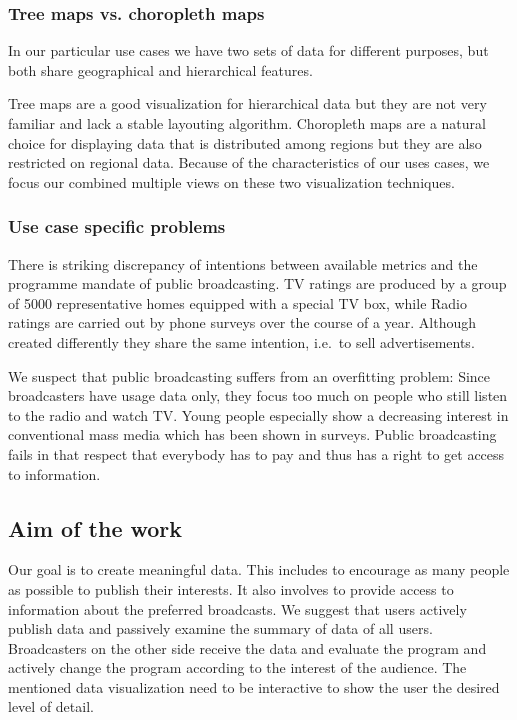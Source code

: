 \documentclass{article}
\begin{document}
\subsubsection{Tree maps vs. choropleth maps}

In our particular use cases we have two sets of data for different purposes, but both share geographical and hierarchical features.

Tree maps are a good visualization for hierarchical data but they are not very familiar and lack a stable layouting algorithm.
Choropleth maps are a natural choice for displaying data that is distributed among regions but they are also restricted on regional data.
Because of the characteristics of our uses cases, we focus our combined multiple views on these two visualization techniques.






\subsubsection{Use case specific problems}
There is striking discrepancy of intentions between available metrics and the programme mandate of public broadcasting.
TV ratings are produced by a group of 5000 representative homes equipped with a special TV box, while Radio ratings are carried out by phone surveys over the course of a year.
Although created differently they share the same intention, i.e.\ to sell advertisements.

We suspect that public broadcasting suffers from an overfitting problem:
Since broadcasters have usage data only, they focus too much on people who still listen to the radio and watch TV.
Young people especially show a decreasing interest in conventional mass media which has been shown in surveys.
Public broadcasting fails in that respect that everybody has to pay and thus has a right to get access to information.


\subsection{Aim of the work}
Our goal is to create meaningful data.
This includes to encourage as many people as possible to publish their interests.
It also involves to provide access to information about the preferred broadcasts.
We suggest that users actively publish data and passively examine the summary of data of all users.
Broadcasters on the other side receive the data and evaluate the program and actively change the program according to the interest of the audience.
The mentioned data visualization need to be interactive to show the user the desired level of detail.
\end{document}
